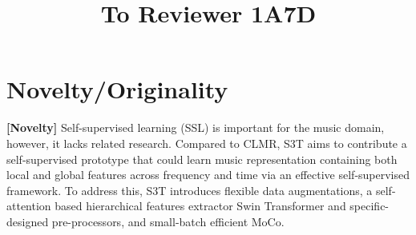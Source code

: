 \documentclass{article}
\title{To Reviewer 1A7D}
\begin{document}
\maketitle

\section{Novelty/Originality}
\noindent\textbf{[Novelty]} Self-supervised learning (SSL) is important for the music domain, however, it lacks related research. Compared to CLMR, S3T aims to contribute a self-supervised prototype that could learn music representation containing both local and global features across frequency and time via an effective self-supervised framework. To address this, S3T introduces flexible data augmentations, a self-attention based hierarchical features extractor Swin Transformer and specific-designed pre-processors, and small-batch efficient MoCo. 
\\
\end{document}
